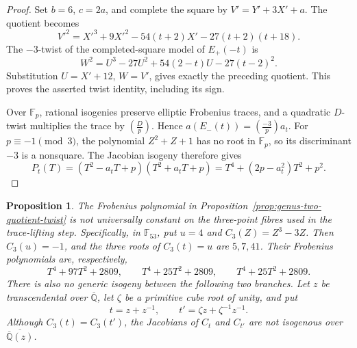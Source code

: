 \documentclass[11pt]{article}
\newtheorem{proposition}[theorem]{Proposition}
\theoremstyle{definition}
\theoremstyle{remark}
\begin{document}
\begin{proof}
Set \(b=6\), \(c=2a\), and complete the square by
\(V'=Y'+3X'+a\). The quotient becomes
\[
 V'^2=X'^3+9X'^2-54(t+2)X'-27(t+2)(t+18).
\]
The \(-3\)-twist of the completed-square model of \(E_+(-t)\) is
\[
 W^2=U^3-27U^2+54(2-t)U-27(t-2)^2.
\]
Substitution \(U=X'+12\), \(W=V'\), gives exactly the preceding
quotient. This proves the asserted twist identity, including its sign.

Over \(\mathbb F_p\), rational isogenies preserve elliptic Frobenius
traces, and a quadratic \(D\)-twist multiplies the trace by
\(\left(\frac Dp\right)\). Hence
\(a(E_-(t))=\left(\frac{-3}{p}\right)a_t\).
For \(p\equiv-1\pmod3\), the polynomial \(Z^2+Z+1\) has no root
in \(\mathbb F_p\), so its discriminant \(-3\) is a nonsquare.
The Jacobian isogeny therefore gives
\[
 P_t(T)=(T^2-a_tT+p)(T^2+a_tT+p)
       =T^4+(2p-a_t^2)T^2+p^2.
\]
\end{proof}

\begin{proposition}\label{prop:genus-two-chebyshev-comparison}
The Frobenius polynomial in
Proposition~\ref{prop:genus-two-quotient-twist} is not universally
constant on the three-point fibres used in the trace-lifting step.
Specifically, in \(\mathbb F_{53}\), put \(u=4\) and
\(C_3(Z)=Z^3-3Z\). Then \(C_3(u)=-1\), and the three roots of
\(C_3(t)=u\) are \(5,7,41\). Their Frobenius polynomials are,
respectively,
\[
 T^4+97T^2+2809,\qquad
 T^4+25T^2+2809,\qquad
 T^4+25T^2+2809.
\]
There is also no generic isogeny between the following two branches.
Let \(z\) be transcendental over \(\overline{\mathbb Q}\), let
\(\zeta\) be a primitive cube root of unity, and put
\[
 t=z+z^{-1},\qquad t'=\zeta z+\zeta^{-1}z^{-1}.
\]
Although \(C_3(t)=C_3(t')\), the Jacobians of \(C_t\) and \(C_{t'}\)
are not isogenous over
\(\overline{\overline{\mathbb Q}(z)}\).
\end{proposition}
\end{document}
